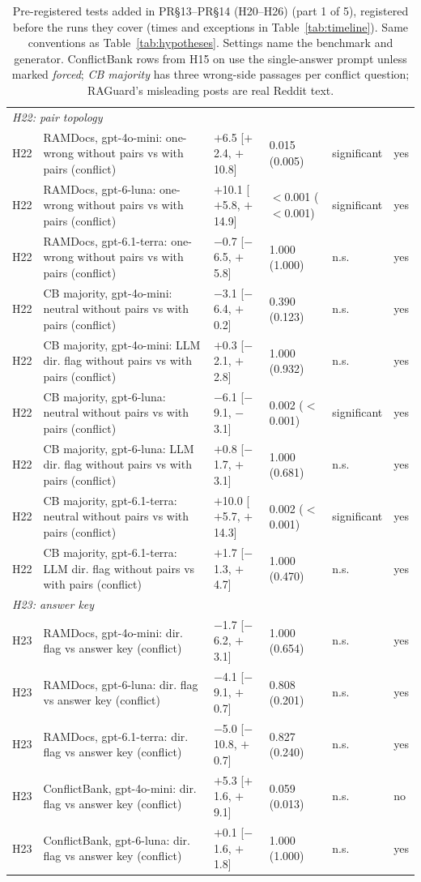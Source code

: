 \begin{table}[p]
{\begin{tabular}{lp{6.6cm}llll}
\multicolumn{6}{l}{\emph{H22: pair topology}} \\
H22 & RAMDocs, gpt-4o-mini: one-wrong without pairs vs with pairs (conflict) & $+$6.5 [$+$2.4, $+$10.8] & 0.015 (0.005) & significant & yes \\
H22 & RAMDocs, gpt-6-luna: one-wrong without pairs vs with pairs (conflict) & $+$10.1 [$+$5.8, $+$14.9] & $<$0.001 ($<$0.001) & significant & yes \\
H22 & RAMDocs, gpt-6.1-terra: one-wrong without pairs vs with pairs (conflict) & $-$0.7 [$-$6.5, $+$5.8] & 1.000 (1.000) & n.s. & yes \\
H22 & CB majority, gpt-4o-mini: neutral without pairs vs with pairs (conflict) & $-$3.1 [$-$6.4, $+$0.2] & 0.390 (0.123) & n.s. & yes \\
H22 & CB majority, gpt-4o-mini: LLM dir. flag without pairs vs with pairs (conflict) & $+$0.3 [$-$2.1, $+$2.8] & 1.000 (0.932) & n.s. & yes \\
H22 & CB majority, gpt-6-luna: neutral without pairs vs with pairs (conflict) & $-$6.1 [$-$9.1, $-$3.1] & 0.002 ($<$0.001) & significant & yes \\
H22 & CB majority, gpt-6-luna: LLM dir. flag without pairs vs with pairs (conflict) & $+$0.8 [$-$1.7, $+$3.1] & 1.000 (0.681) & n.s. & yes \\
H22 & CB majority, gpt-6.1-terra: neutral without pairs vs with pairs (conflict) & $+$10.0 [$+$5.7, $+$14.3] & 0.002 ($<$0.001) & significant & yes \\
H22 & CB majority, gpt-6.1-terra: LLM dir. flag without pairs vs with pairs (conflict) & $+$1.7 [$-$1.3, $+$4.7] & 1.000 (0.470) & n.s. & yes \\
\multicolumn{6}{l}{\emph{H23: answer key}} \\
H23 & RAMDocs, gpt-4o-mini: dir. flag vs answer key (conflict) & $-$1.7 [$-$6.2, $+$3.1] & 1.000 (0.654) & n.s. & yes \\
H23 & RAMDocs, gpt-6-luna: dir. flag vs answer key (conflict) & $-$4.1 [$-$9.1, $+$0.7] & 0.808 (0.201) & n.s. & yes \\
H23 & RAMDocs, gpt-6.1-terra: dir. flag vs answer key (conflict) & $-$5.0 [$-$10.8, $+$0.7] & 0.827 (0.240) & n.s. & yes \\
H23 & ConflictBank, gpt-4o-mini: dir. flag vs answer key (conflict) & $+$5.3 [$+$1.6, $+$9.1] & 0.059 (0.013) & n.s. & no \\
H23 & ConflictBank, gpt-6-luna: dir. flag vs answer key (conflict) & $+$0.1 [$-$1.6, $+$1.8] & 1.000 (1.000) & n.s. & yes \\
\bottomrule
\end{tabular}}
\caption{Pre-registered tests added in PR\S13--PR\S14 (H20--H26) (part 1 of 5), registered before the runs they cover (times and exceptions in
Table~\ref{tab:timeline}). Same conventions as
Table~\ref{tab:hypotheses}. Settings name the benchmark and generator. ConflictBank rows from H15 on use the
single-answer prompt unless marked \emph{forced}; \emph{CB majority} has three wrong-side passages per conflict
question; RAGuard's misleading posts are real Reddit text.}
\label{tab:hypotheses6}
\end{table}

